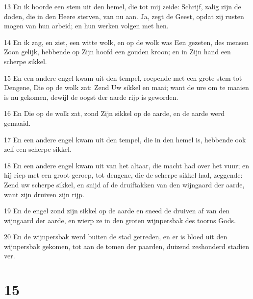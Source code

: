 \par 13 En ik hoorde een stem uit den hemel, die tot mij zeide: Schrijf, zalig zijn de doden, die in den Heere sterven, van nu aan. Ja, zegt de Geest, opdat zij rusten mogen van hun arbeid; en hun werken volgen met hen.
\par 14 En ik zag, en ziet, een witte wolk, en op de wolk was Een gezeten, des mensen Zoon gelijk, hebbende op Zijn hoofd een gouden kroon; en in Zijn hand een scherpe sikkel.
\par 15 En een andere engel kwam uit den tempel, roepende met een grote stem tot Dengene, Die op de wolk zat: Zend Uw sikkel en maai; want de ure om te maaien is nu gekomen, dewijl de oogst der aarde rijp is geworden.
\par 16 En Die op de wolk zat, zond Zijn sikkel op de aarde, en de aarde werd gemaaid.
\par 17 En een andere engel kwam uit den tempel, die in den hemel is, hebbende ook zelf een scherpe sikkel.
\par 18 En een andere engel kwam uit van het altaar, die macht had over het vuur; en hij riep met een groot geroep, tot dengene, die de scherpe sikkel had, zeggende: Zend uw scherpe sikkel, en snijd af de druiftakken van den wijngaard der aarde, want zijn druiven zijn rijp.
\par 19 En de engel zond zijn sikkel op de aarde en sneed de druiven af van den wijngaard der aarde, en wierp ze in den groten wijnpersbak des toorns Gods.
\par 20 En de wijnpersbak werd buiten de stad getreden, en er is bloed uit den wijnpersbak gekomen, tot aan de tomen der paarden, duizend zeshonderd stadien ver.

\chapter{15}

